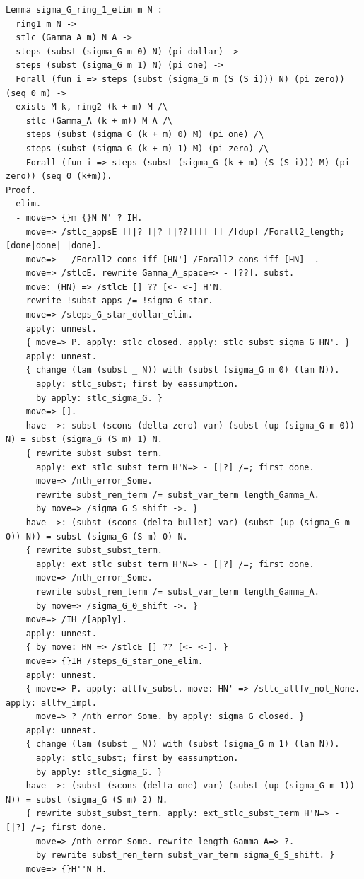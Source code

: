 \begin{lstlisting}
Lemma sigma_G_ring_1_elim m N :
  ring1 m N ->
  stlc (Gamma_A m) N A ->
  steps (subst (sigma_G m 0) N) (pi dollar) ->
  steps (subst (sigma_G m 1) N) (pi one) ->
  Forall (fun i => steps (subst (sigma_G m (S (S i))) N) (pi zero)) (seq 0 m) ->
  exists M k, ring2 (k + m) M /\
    stlc (Gamma_A (k + m)) M A /\
    steps (subst (sigma_G (k + m) 0) M) (pi one) /\
    steps (subst (sigma_G (k + m) 1) M) (pi zero) /\
    Forall (fun i => steps (subst (sigma_G (k + m) (S (S i))) M) (pi zero)) (seq 0 (k+m)).
Proof. 
  elim.
  - move=> {}m {}N N' ? IH.
    move=> /stlc_appsE [[|? [|? [|??]]]] [] /[dup] /Forall2_length; [done|done| |done].
    move=> _ /Forall2_cons_iff [HN'] /Forall2_cons_iff [HN] _.
    move=> /stlcE. rewrite Gamma_A_space=> - [??]. subst.
    move: (HN) => /stlcE [] ?? [<- <-] H'N.
    rewrite !subst_apps /= !sigma_G_star.
    move=> /steps_G_star_dollar_elim.
    apply: unnest.
    { move=> P. apply: stlc_closed. apply: stlc_subst_sigma_G HN'. }
    apply: unnest. 
    { change (lam (subst _ N)) with (subst (sigma_G m 0) (lam N)).
      apply: stlc_subst; first by eassumption.
      by apply: stlc_sigma_G. }
    move=> [].
    have ->: subst (scons (delta zero) var) (subst (up (sigma_G m 0)) N) = subst (sigma_G (S m) 1) N.
    { rewrite subst_subst_term.
      apply: ext_stlc_subst_term H'N=> - [|?] /=; first done.
      move=> /nth_error_Some.
      rewrite subst_ren_term /= subst_var_term length_Gamma_A.
      by move=> /sigma_G_S_shift ->. }
    have ->: (subst (scons (delta bullet) var) (subst (up (sigma_G m 0)) N)) = subst (sigma_G (S m) 0) N.
    { rewrite subst_subst_term.
      apply: ext_stlc_subst_term H'N=> - [|?] /=; first done.
      move=> /nth_error_Some.
      rewrite subst_ren_term /= subst_var_term length_Gamma_A.
      by move=> /sigma_G_0_shift ->. }
    move=> /IH /[apply].
    apply: unnest.
    { by move: HN => /stlcE [] ?? [<- <-]. }
    move=> {}IH /steps_G_star_one_elim.
    apply: unnest. 
    { move=> P. apply: allfv_subst. move: HN' => /stlc_allfv_not_None. apply: allfv_impl.
      move=> ? /nth_error_Some. by apply: sigma_G_closed. }
    apply: unnest. 
    { change (lam (subst _ N)) with (subst (sigma_G m 1) (lam N)).
      apply: stlc_subst; first by eassumption.
      by apply: stlc_sigma_G. }
    have ->: (subst (scons (delta one) var) (subst (up (sigma_G m 1)) N)) = subst (sigma_G (S m) 2) N.
    { rewrite subst_subst_term. apply: ext_stlc_subst_term H'N=> - [|?] /=; first done.
      move=> /nth_error_Some. rewrite length_Gamma_A=> ?.
      by rewrite subst_ren_term subst_var_term sigma_G_S_shift. }
    move=> {}H''N H.

\end{lstlisting}
